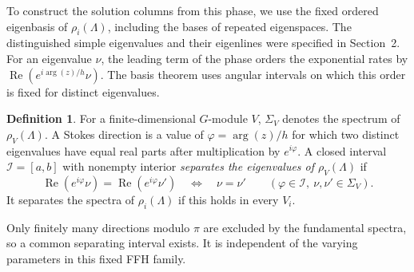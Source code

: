 \documentclass[11pt,leqno]{amsart}
\numberwithin{equation}{section}
\theoremstyle{plain}
\theoremstyle{definition}
\newtheorem{definition}[theorem]{Definition}
\theoremstyle{plain}
\theoremstyle{definition}
\theoremstyle{remark}
\begin{document}
To construct the solution columns from this phase, we use the fixed ordered eigenbasis of $\rho_i(\Lambda)$, including the bases of repeated eigenspaces.  The distinguished simple eigenvalues and their eigenlines were specified in Section~2.  For an eigenvalue $\nu$, the leading term of the phase orders the exponential rates by $\operatorname{Re}(e^{i\arg(z)/h}\nu)$.  The basis theorem uses angular intervals on which this order is fixed for distinct eigenvalues.
\begin{definition}\label{def:spectrally-separating-interval}
For a finite-dimensional $G$-module $V$, $\Sigma_V$ denotes the spectrum of $\rho_V(\Lambda)$.  A Stokes direction is a value of $\varphi=\arg(z)/h$ for which two distinct eigenvalues have equal real parts after multiplication by $e^{i\varphi}$.  A closed interval $\mathcal I=[a,b]$ with nonempty interior \emph{separates the eigenvalues of $\rho_V(\Lambda)$} if
\begin{equation}\label{eq:explicit-spectral-separation}
 \operatorname{Re}(e^{i\varphi}\nu)
 =\operatorname{Re}(e^{i\varphi}\nu')
 \quad\Longleftrightarrow\quad\nu=\nu'
 \qquad(\varphi\in\mathcal I,\ \nu,\nu'\in\Sigma_V).
\end{equation}
It separates the spectra of $\rho_i(\Lambda)$ if this holds in every $V_i$.
\end{definition}
Only finitely many directions modulo $\pi$ are excluded by the fundamental spectra, so a common separating interval exists.  It is independent of the varying parameters in this fixed FFH family.
\end{document}

